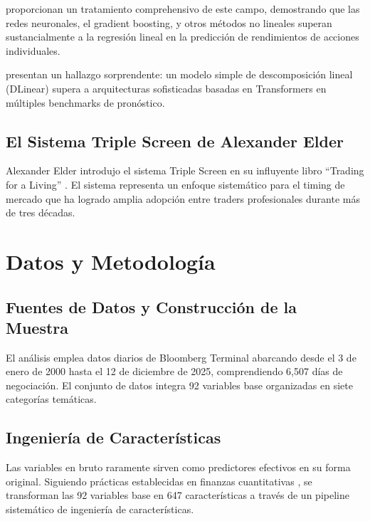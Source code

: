 \documentclass[11pt,a4paper]{article}
\begin{document}
\citet{gu2020} proporcionan un tratamiento comprehensivo de este campo, demostrando que las redes neuronales, el gradient boosting, y otros m\'etodos no lineales superan sustancialmente a la regresi\'on lineal en la predicci\'on de rendimientos de acciones individuales.

\citet{zeng2023} presentan un hallazgo sorprendente: un modelo simple de descomposici\'on lineal (DLinear) supera a arquitecturas sofisticadas basadas en Transformers en m\'ultiples benchmarks de pron\'ostico.

\subsection{El Sistema Triple Screen de Alexander Elder}

Alexander Elder introdujo el sistema Triple Screen en su influyente libro ``Trading for a Living'' \citep{elder1993}. El sistema representa un enfoque sistem\'atico para el timing de mercado que ha logrado amplia adopci\'on entre traders profesionales durante m\'as de tres d\'ecadas.

\section{Datos y Metodolog\'ia}

\subsection{Fuentes de Datos y Construcci\'on de la Muestra}

El an\'alisis emplea datos diarios de Bloomberg Terminal abarcando desde el 3 de enero de 2000 hasta el 12 de diciembre de 2025, comprendiendo 6,507 d\'ias de negociaci\'on. El conjunto de datos integra 92 variables base organizadas en siete categor\'ias tem\'aticas.

\subsection{Ingenier\'ia de Caracter\'isticas}

Las variables en bruto raramente sirven como predictores efectivos en su forma original. Siguiendo pr\'acticas establecidas en finanzas cuantitativas \citep{gu2020}, se transforman las 92 variables base en 647 caracter\'isticas a trav\'es de un pipeline sistem\'atico de ingenier\'ia de caracter\'isticas.
\end{document}
